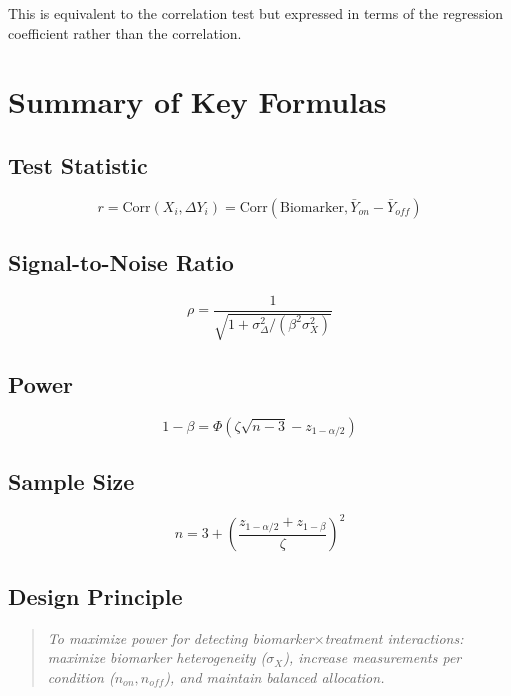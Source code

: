 \documentclass[11pt]{article}
\theoremstyle{definition}
\begin{document}
This is equivalent to the correlation test but expressed in terms of the
regression coefficient rather than the correlation.

\section{Summary of Key Formulas}

\subsection{Test Statistic}
\begin{equation}
r = \text{Corr}(X_i, \Delta Y_i) = \text{Corr}(\text{Biomarker}, \bar{Y}_{on} - \bar{Y}_{off})
\end{equation}

\subsection{Signal-to-Noise Ratio}
\begin{equation}
\rho = \frac{1}{\sqrt{1 + \sigma_{\Delta}^2 / (\beta^2 \sigma_X^2)}}
\end{equation}

\subsection{Power}
\begin{equation}
1 - \beta = \Phi\left(\zeta\sqrt{n-3} - z_{1-\alpha/2}\right)
\end{equation}

\subsection{Sample Size}
\begin{equation}
n = 3 + \left(\frac{z_{1-\alpha/2} + z_{1-\beta}}{\zeta}\right)^2
\end{equation}

\subsection{Design Principle}
\begin{quote}
\textit{To maximize power for detecting biomarker$\times$treatment interactions:
maximize biomarker heterogeneity ($\sigma_X$), increase measurements per
condition ($n_{on}, n_{off}$), and maintain balanced allocation.}
\end{quote}
\end{document}
